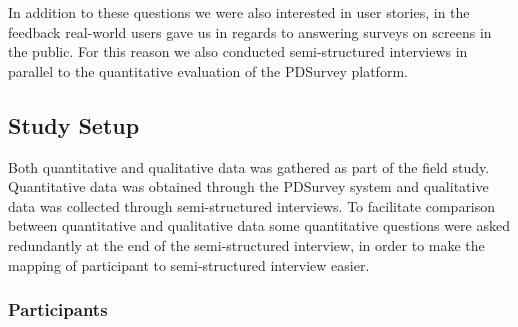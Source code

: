 	In addition to these questions we were also interested in user stories, in the feedback real-world users gave us in regards to answering surveys on screens in the public. For this reason we also conducted semi-structured interviews in parallel to the quantitative evaluation of the PDSurvey platform.




\subsection{Study Setup}

	Both quantitative and qualitative data was gathered as part of the field study. Quantitative data was obtained through the PDSurvey system and qualitative data was collected through semi-structured interviews. To facilitate comparison between quantitative and qualitative data some quantitative questions were asked redundantly at the end of the semi-structured interview, in order to make the mapping of participant to semi-structured interview easier.




	\subsubsection{Participants}

